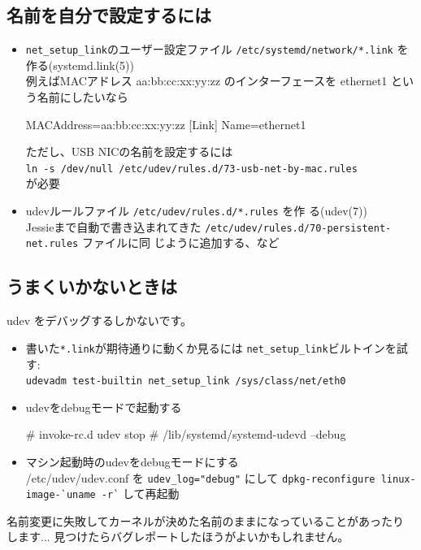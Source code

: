 \documentclass[mingoth,a4paper]{jsarticle}
\begin{document}
\subsection[containsverbatim]{名前を自分で設定するには}
\begin{itemize}
 \item \texttt{net\_setup\_link}のユーザー設定ファイル \texttt{/etc/systemd/network/*.link}
       を作る(systemd.link(5))\\
       例えばMACアドレス aa:bb:cc:xx:yy:zz のインターフェースを ethernet1 という名前にしたいなら
\begin{commandline}
[Match]
MACAddress=aa:bb:cc:xx:yy:zz
[Link]
Name=ethernet1
\end{commandline}
ただし、USB NICの名前を設定するには\\
       \verb|ln -s /dev/null /etc/udev/rules.d/73-usb-net-by-mac.rules|\\
       が必要
 \item udevルールファイル \texttt{/etc/udev/rules.d/*.rules} を作
       る(udev(7))\\
       Jessieまで自動で書き込まれてきた 
       \texttt{/etc/udev/rules.d/70-persistent-net.rules} ファイルに同
       じように追加する、など
\end{itemize}


\subsection[containsverbatim]{うまくいかないときは}
 udev をデバッグするしかないです。
\begin{itemize}
 \item 書いた\texttt{*.link}が期待通りに動くか見るには \texttt{net\_setup\_link}ビルトインを試す:\\
       \verb|udevadm test-builtin net_setup_link /sys/class/net/eth0|
 \item udevをdebugモードで起動する
\begin{commandline}
# invoke-rc.d udev stop
# /lib/systemd/systemd-udevd --debug
\end{commandline}
 \item マシン起動時のudevをdebugモードにする\\
       /etc/udev/udev.conf を \verb|udev_log="debug"| にして
       \verb|dpkg-reconfigure linux-image-`uname -r`|
       して再起動
\end{itemize}

 名前変更に失敗してカーネルが決めた名前のままになっていることがあったり
 します...
 見つけたらバグレポートしたほうがよいかもしれません。
\end{document}
